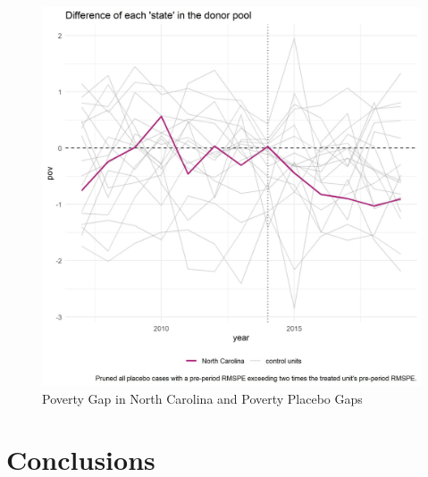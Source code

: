 \documentclass{article}
\begin{document}
 \begin{figure}[H]
    \caption{Poverty Gap in North Carolina and Poverty Placebo Gaps}
    \begin{center}
        \includegraphics[width=.85\textwidth]{nc_pov_placebos}
    \end{center}
    \label{fig:nc_pov_placebos}{}
\end{figure}

\section{Conclusions}

{}

\end{document}
